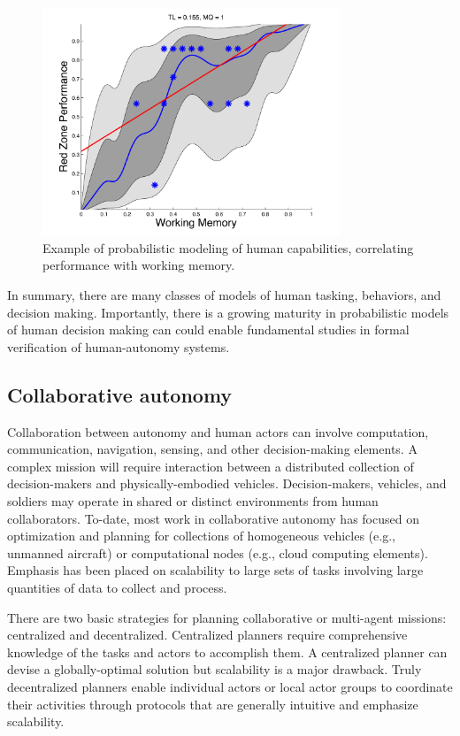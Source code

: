 \begin{figure}[h] 
   \centering
   \includegraphics[width=3.5in]{GP-fig.pdf} 
   \caption{Example of probabilistic modeling of human capabilities, correlating performance with working memory.}
   \label{fig:prob-humans}
\end{figure}

In summary, there are many classes of models of human tasking, behaviors, and decision making. Importantly, there is a growing maturity in probabilistic models of human decision making can could enable fundamental studies in formal verification of human-autonomy systems. 


\subsection*{Collaborative autonomy}


Collaboration between autonomy and human actors can involve
computation, communication, navigation, sensing, and other decision-making elements.  
A complex mission will require interaction between a distributed collection of decision-makers
and physically-embodied vehicles.  Decision-makers, vehicles, and soldiers may
operate in shared or distinct environments from human collaborators.  To-date, most work
in collaborative autonomy has focused on optimization and planning for collections of homogeneous
vehicles (e.g., unmanned aircraft) or computational nodes (e.g., cloud computing elements).  
Emphasis has been placed on scalability to large sets of tasks involving 
large quantities of data to collect and process.  

There are two basic strategies for planning collaborative or multi-agent missions:  
centralized and decentralized.  Centralized planners require 
comprehensive knowledge of the tasks and actors to accomplish them.  A centralized planner
can devise a globally-optimal solution but scalability is a major drawback.  Truly decentralized
planners enable individual actors or local actor groups to coordinate their activities through
protocols that are generally intuitive and emphasize scalability.

